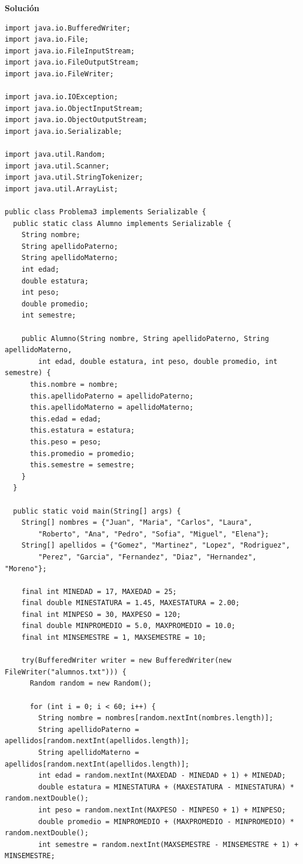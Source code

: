 \documentclass[11pt, twocolumn]{article}
\begin{document}
  \textbf{Solución}
  \begin{lstlisting}
import java.io.BufferedWriter;
import java.io.File;
import java.io.FileInputStream;
import java.io.FileOutputStream;
import java.io.FileWriter;

import java.io.IOException;
import java.io.ObjectInputStream;
import java.io.ObjectOutputStream;
import java.io.Serializable;

import java.util.Random;
import java.util.Scanner;
import java.util.StringTokenizer;
import java.util.ArrayList;

public class Problema3 implements Serializable {
  public static class Alumno implements Serializable {
    String nombre;
    String apellidoPaterno;
    String apellidoMaterno;
    int edad;
    double estatura;
    int peso;
    double promedio;
    int semestre;

    public Alumno(String nombre, String apellidoPaterno, String apellidoMaterno, 
        int edad, double estatura, int peso, double promedio, int semestre) {
      this.nombre = nombre;
      this.apellidoPaterno = apellidoPaterno;
      this.apellidoMaterno = apellidoMaterno;
      this.edad = edad;
      this.estatura = estatura;
      this.peso = peso;
      this.promedio = promedio;
      this.semestre = semestre;
    }
  }

  public static void main(String[] args) {
    String[] nombres = {"Juan", "Maria", "Carlos", "Laura", 
        "Roberto", "Ana", "Pedro", "Sofia", "Miguel", "Elena"};
    String[] apellidos = {"Gomez", "Martinez", "Lopez", "Rodriguez", 
        "Perez", "Garcia", "Fernandez", "Diaz", "Hernandez", "Moreno"};

    final int MINEDAD = 17, MAXEDAD = 25;
    final double MINESTATURA = 1.45, MAXESTATURA = 2.00;
    final int MINPESO = 30, MAXPESO = 120;
    final double MINPROMEDIO = 5.0, MAXPROMEDIO = 10.0;
    final int MINSEMESTRE = 1, MAXSEMESTRE = 10;

    try(BufferedWriter writer = new BufferedWriter(new FileWriter("alumnos.txt"))) {
      Random random = new Random();

      for (int i = 0; i < 60; i++) {
        String nombre = nombres[random.nextInt(nombres.length)];
        String apellidoPaterno = apellidos[random.nextInt(apellidos.length)];
        String apellidoMaterno = apellidos[random.nextInt(apellidos.length)];
        int edad = random.nextInt(MAXEDAD - MINEDAD + 1) + MINEDAD;
        double estatura = MINESTATURA + (MAXESTATURA - MINESTATURA) * random.nextDouble();
        int peso = random.nextInt(MAXPESO - MINPESO + 1) + MINPESO;
        double promedio = MINPROMEDIO + (MAXPROMEDIO - MINPROMEDIO) * random.nextDouble();
        int semestre = random.nextInt(MAXSEMESTRE - MINSEMESTRE + 1) + MINSEMESTRE;


\end{lstlisting}
\end{document}

